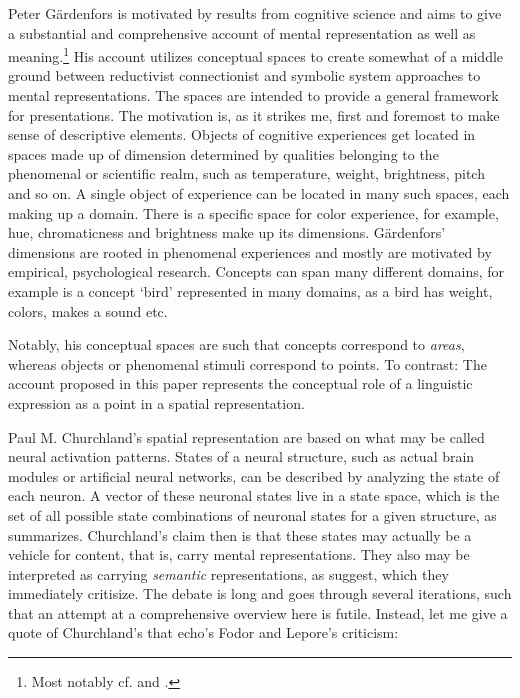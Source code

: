 \documentclass[11pt, a4paper]{scrartcl}
\renewcommand{\i}[1]{\emph{#1}}
\begin{document}
Peter Gärdenfors is motivated by results from cognitive science and aims to give a substantial and comprehensive account of mental representation as well as meaning.\footnote{Most notably cf. \textcite{gärdenfors2004conceptual} and \textcite{Gardenfors2014-GRDTGO}.} His account utilizes conceptual spaces to create somewhat of a middle ground between reductivist connectionist and symbolic system approaches to mental representations. The spaces are intended to provide a general framework for presentations. The motivation is, as it strikes me, first and foremost to make sense of descriptive elements. Objects of cognitive experiences get located in spaces made up of dimension determined by qualities belonging to the phenomenal or scientific realm, such as temperature, weight, brightness, pitch and so on. A single object of experience can be located in many such spaces, each making up a domain. There is a specific space for color experience, for example, hue, chromaticness and brightness make up its dimensions. Gärdenfors' dimensions are rooted in phenomenal experiences and mostly are motivated by empirical, psychological research. Concepts can span many different domains, for example is a concept `bird' represented in many domains, as a bird has weight, colors, makes a sound etc. 

Notably, his conceptual spaces are such that concepts correspond to \i{areas}, whereas objects or phenomenal stimuli correspond to points. To contrast: The account proposed in this paper represents the conceptual role of a linguistic expression as a point in a spatial representation.

Paul M. Churchland's spatial representation are based on what may be called neural activation patterns. States of a neural structure, such as actual brain modules or artificial neural networks, can be described by analyzing the state of each neuron. A vector of these neuronal states live in a state space, which is the set of all possible state combinations of neuronal states for a given structure, as \textcite{Tiffany1999-TIFSSD-4} summarizes. Churchland's claim then is that these states may actually be a vehicle for content, that is, carry mental representations. They also may be interpreted as carrying \i{semantic} representations, as \textcite{Fodor1999-FODAAS} suggest, which they immediately critisize. The debate is long and goes through several iterations, such that an attempt at a comprehensive overview here is futile. Instead, let me give a quote of Churchland's that echo's Fodor and Lepore's criticism:
\end{document}
